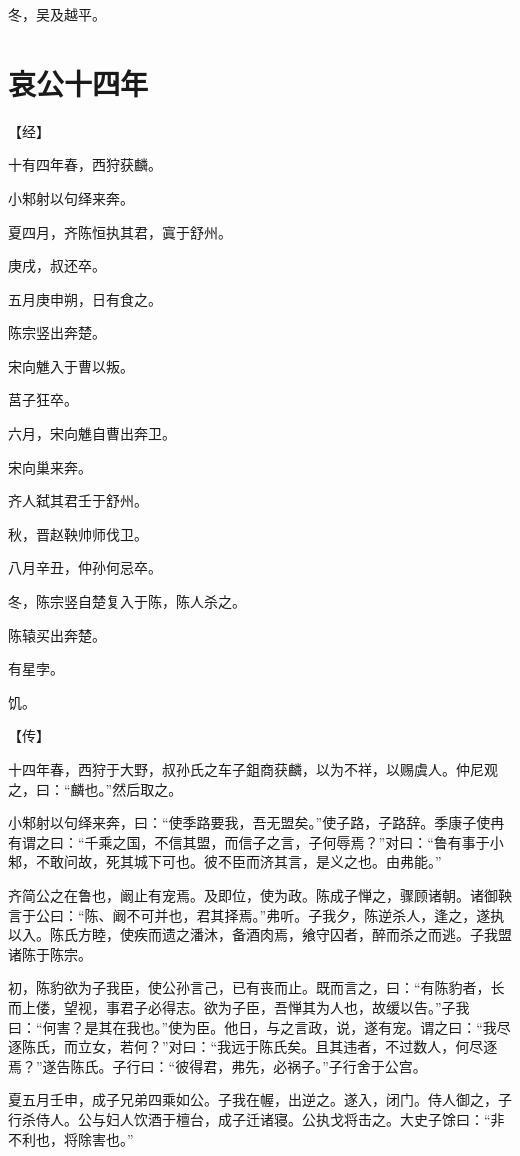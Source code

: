 \documentclass[a4paper,12pt,UTF8,twoside]{ctexbook}
\begin{document}
冬，吴及越平。


\chapter{哀公十四年}


【经】

十有四年春，西狩获麟。

小邾射以句绎来奔。

夏四月，齐陈恒执其君，寘于舒州。

庚戌，叔还卒。

五月庚申朔，日有食之。

陈宗竖出奔楚。

宋向魋入于曹以叛。

莒子狂卒。

六月，宋向魋自曹出奔卫。

宋向巢来奔。

齐人弑其君壬于舒州。

秋，晋赵鞅帅师伐卫。

八月辛丑，仲孙何忌卒。

冬，陈宗竖自楚复入于陈，陈人杀之。

陈辕买出奔楚。

有星孛。

饥。

【传】

十四年春，西狩于大野，叔孙氏之车子鉏商获麟，以为不祥，以赐虞人。仲尼观之，曰：“麟也。”然后取之。

小邾射以句绎来奔，曰：“使季路要我，吾无盟矣。”使子路，子路辞。季康子使冉有谓之曰：“千乘之国，不信其盟，而信子之言，子何辱焉？”对曰：“鲁有事于小邾，不敢问故，死其城下可也。彼不臣而济其言，是义之也。由弗能。”

齐简公之在鲁也，阚止有宠焉。及即位，使为政。陈成子惮之，骤顾诸朝。诸御鞅言于公曰：“陈、阚不可并也，君其择焉。”弗听。子我夕，陈逆杀人，逢之，遂执以入。陈氏方睦，使疾而遗之潘沐，备酒肉焉，飨守囚者，醉而杀之而逃。子我盟诸陈于陈宗。

初，陈豹欲为子我臣，使公孙言己，已有丧而止。既而言之，曰：“有陈豹者，长而上偻，望视，事君子必得志。欲为子臣，吾惮其为人也，故缓以告。”子我曰：“何害？是其在我也。”使为臣。他日，与之言政，说，遂有宠。谓之曰：“我尽逐陈氏，而立女，若何？”对曰：“我远于陈氏矣。且其违者，不过数人，何尽逐焉？”遂告陈氏。子行曰：“彼得君，弗先，必祸子。”子行舍于公宫。

夏五月壬申，成子兄弟四乘如公。子我在幄，出逆之。遂入，闭门。侍人御之，子行杀侍人。公与妇人饮酒于檀台，成子迁诸寝。公执戈将击之。大史子馀曰：“非不利也，将除害也。”
\end{document}

